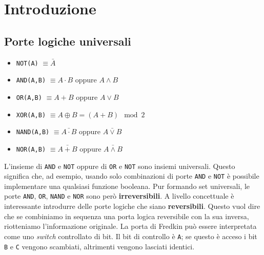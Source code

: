 \documentclass[12pt, a4paper]{report}
\begin{document}
\newpage
\tableofcontents
\chapter{Introduzione}
\section{Porte logiche universali}
\begin{itemize}
    \item \texttt{NOT(A)} $\equiv \bar{A}$
    \item \texttt{AND(A,B)} $\equiv A \cdot B$ oppure $A \land B$
    \item \texttt{OR(A,B)} $\equiv A + B$ oppure $A \lor B$
    \item \texttt{XOR(A,B)} $\equiv A \oplus B = (A+B) \mod 2$
    \item \texttt{NAND(A,B)} $\equiv \bar{A \cdot B}$ oppure $\bar{A \lor B}$
    \item \texttt{NOR(A,B)} $\equiv \bar{A + B}$ oppure $\bar{A \land B}$
\end{itemize}
L'insieme di \texttt{AND} e \texttt{NOT} oppure di \texttt{OR} e \texttt{NOT} sono insiemi universali. Questo significa che, ad esempio, usando solo combinazioni di porte \texttt{AND} e \texttt{NOT} è possibile implementare una qualsiasi funzione booleana. Pur formando set universali, le porte \texttt{AND}, \texttt{OR}, \texttt{NAND} e \texttt{NOR} sono però \textbf{irreversibili}. A livello concettuale è interessante introdurre delle porte logiche che siano \textbf{reversibili}. Questo vuol dire che se combiniamo in sequenza una porta logica reversibile con la sua inversa, riotteniamo l'informazione originale. La porta di Fredkin può essere interpretata come uno \textit{switch} controllato di bit. Il bit di controllo è \texttt{A}; se questo è acceso i bit \texttt{B} e \texttt{C} vengono scambiati, altrimenti vengono lasciati identici.
\end{document}
